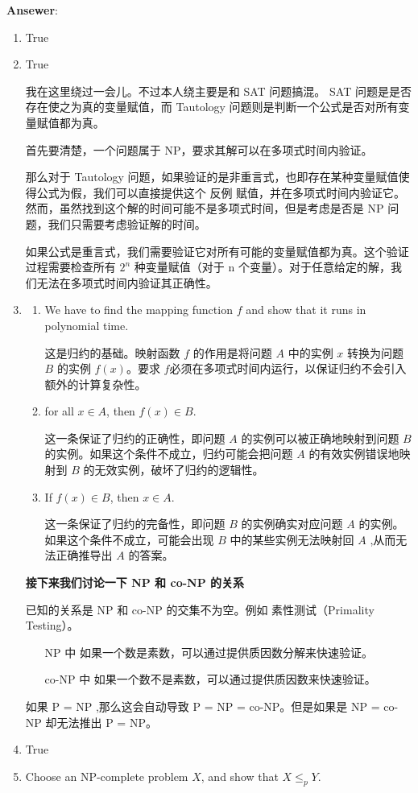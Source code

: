 \documentclass{article}
\begin{document}
\textbf{Ansewer}:
\begin{enumerate}
    \item True
    \item True
    
    我在这里绕过一会儿。不过本人绕主要是和 SAT 问题搞混。 SAT 问题是是否存在使之为真的变量赋值，而 Tautology 问题则是判断一个公式是否对所有变量赋值都为真。
    
    首先要清楚，一个问题属于 NP，要求其解可以在多项式时间内验证。

    那么对于 Tautology 问题，如果验证的是非重言式，也即存在某种变量赋值使得公式为假，我们可以直接提供这个 反例 赋值，并在多项式时间内验证它。然而，虽然找到这个解的时间可能不是多项式时间，但是考虑是否是 NP 问题，我们只需要考虑验证解的时间。

    如果公式是重言式，我们需要验证它对所有可能的变量赋值都为真。这个验证过程需要检查所有 $2^n$ 种变量赋值（对于 n 个变量）。对于任意给定的解，我们无法在多项式时间内验证其正确性。
    \item 
    \begin{enumerate}
        \item We have to find the mapping function $f$ and show that it runs in polynomial time.
        
        这是归约的基础。映射函数 $f$ 的作用是将问题 $A$ 中的实例 $x$ 转换为问题 $B$ 的实例 $f(x)$。要求 $f$必须在多项式时间内运行，以保证归约不会引入额外的计算复杂性。
        \item for all $x \in A$, then $f(x) \in B$.
        
        这一条保证了归约的正确性，即问题 $A$ 的实例可以被正确地映射到问题 $B$ 的实例。如果这个条件不成立，归约可能会把问题 $A$ 的有效实例错误地映射到 $B$ 的无效实例，破坏了归约的逻辑性。
        \item If $f(x) \in B$, then $x \in A$.
        
        这一条保证了归约的完备性，即问题 $B$ 的实例确实对应问题 $A$ 的实例。如果这个条件不成立，可能会出现 $B$ 中的某些实例无法映射回 $A$ ,从而无法正确推导出 $A$ 的答案。
    \end{enumerate}

    \textbf{接下来我们讨论一下 NP 和 co-NP 的关系}

    已知的关系是 NP 和 co-NP 的交集不为空。例如 素性测试（Primality Testing）。

    \begin{itemize}
        \item [NP 中] 如果一个数是素数，可以通过提供质因数分解来快速验证。
        \item [co-NP 中] 如果一个数不是素数，可以通过提供质因数来快速验证。
    \end{itemize}

    如果 P = NP ,那么这会自动导致 P = NP = co-NP。但是如果是 NP = co-NP 却无法推出 P = NP。
    \item True
    \item Choose an NP-complete problem $X$, and show that $X \leq_p Y$.
\end{enumerate}
\end{document}
